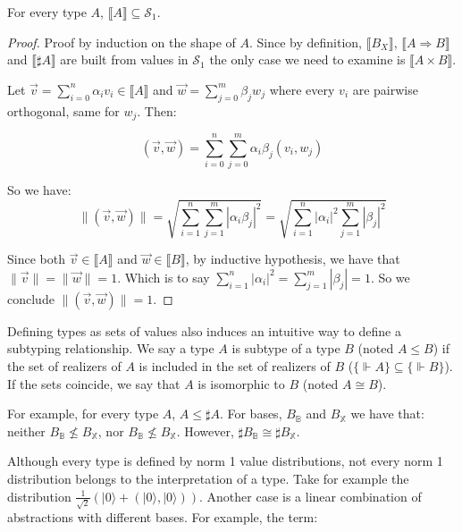 \documentclass[runningheads,orivec]{llncs}
\newcommand\ket[1]{\ensuremath{|#1\rangle}}
\def\Sph{\mathcal{S}_1}       %
\def\Pair#1#2{(#1,#2)} %
\def\Arr{\Rightarrow}
\def\sem#1{\llbracket#1\rrbracket}
\def\real{\Vdash}
\newcommand\B{\mathbb B}
\newcommand\XB{\mathbb X}
\newcommand\basis[1]{\ensuremath{B_{ #1 }}}
\begin{document}
\begin{proposition}\label{prop:UnitaryTypes}
  For every type $A$, $\sem{A}\subseteq\Sph$.
\end{proposition}

\begin{proof}
  Proof by induction on the shape of $A$. Since by definition, $\sem{\basis{X}}$, $\sem{A\Arr B}$ and $\sem{\sharp{A}}$ are built from values in $\Sph$ the only case we need to examine is $\sem{A\times B}$.
  
  Let $\vec v = \sum_{i=0}^{n} \alpha_i v_i \in\sem{A}$ and $\vec w = \sum_{j=0}^{m} \beta_j w_j$ where every $v_i$ are pairwise orthogonal, same for $w_j$. Then:
     
  \[(\vec v, \vec w) = \sum_{i=0}^{n} \sum_{j=0}^{m} \alpha_i\beta_j (v_i,w_j)\]
  
  So we have: 
  \[\|\Pair{\vec v}{\vec w}\| = \sqrt{\sum_{i=1}^n\sum_{j=1}^{m} |\alpha_i\beta_j|^2} = \sqrt{\sum_{i=1}^n |\alpha_i|^2 \sum_{j=1}^{m} |\beta_j|^2}\]

  Since both $\vec v\in\sem{A}$ and $\vec w\in\sem{B}$, by inductive hypothesis, we have that $\|\vec v\| = \| \vec w \| = 1$. Which is to say $\sum_{i=1}^{n} |\alpha_i|^2 = \sum_{j=1}^{m} |\beta_j| = 1$. So we conclude $\|\Pair{\vec{v}}{\vec{w}}\| = 1$.
  
\end{proof}

Defining types as sets of values also induces an intuitive way to define a subtyping relationship. We say a type $A$ is subtype of a type $B$ (noted $A\leq B$) if the set of realizers of $A$ is included in the set of realizers of $B$ ($\{\real A\}\subseteq\{\real B\}$). If the sets coincide, we say that $A$ is isomorphic to $B$ (noted $A\cong B$). 

\begin{example}
  For example, for every type $A$, $A\leq\sharp A$. For bases, $\basis{\B}$ and $\basis{\XB}$ we have that: neither $\basis{\B}\not\leq\basis{\XB}$, nor $\basis{\B}\not\leq\basis{\XB}$. However, $\sharp\basis{\B}\cong\sharp\basis{\XB}$.
\end{example}

Although every type is defined by norm 1 value distributions, not every norm 1 distribution belongs to the interpretation of a type. Take for example the distribution $\frac{1}{\sqrt{2}} (\ket{0} + \Pair{\ket{0}}{\ket 0})$. Another case is a linear combination of abstractions with different bases. For example, the term:
\end{document}
